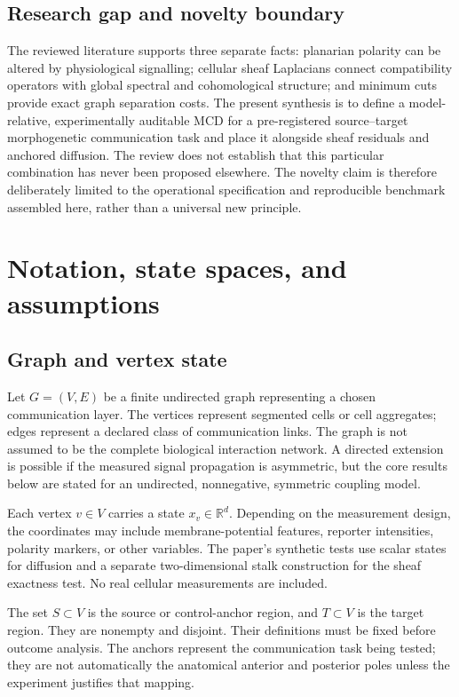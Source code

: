 \documentclass[12pt,a4paper]{article}
\newcommand{\R}{\mathbb{R}}
\begin{document}
\subsection{Research gap and novelty boundary}
The reviewed literature supports three separate facts: planarian polarity can be altered by physiological signalling; cellular sheaf Laplacians connect compatibility operators with global spectral and cohomological structure; and minimum cuts provide exact graph separation costs. The present synthesis is to define a model-relative, experimentally auditable MCD for a pre-registered source--target morphogenetic communication task and place it alongside sheaf residuals and anchored diffusion. The review does not establish that this particular combination has never been proposed elsewhere. The novelty claim is therefore deliberately limited to the operational specification and reproducible benchmark assembled here, rather than a universal new principle.

\section{Notation, state spaces, and assumptions}
\subsection{Graph and vertex state}
Let \(G=(V,E)\) be a finite undirected graph representing a chosen communication layer. The vertices represent segmented cells or cell aggregates; edges represent a declared class of communication links. The graph is not assumed to be the complete biological interaction network. A directed extension is possible if the measured signal propagation is asymmetric, but the core results below are stated for an undirected, nonnegative, symmetric coupling model.

Each vertex \(v\in V\) carries a state \(x_v\in\R^d\). Depending on the measurement design, the coordinates may include membrane-potential features, reporter intensities, polarity markers, or other variables. The paper's synthetic tests use scalar states for diffusion and a separate two-dimensional stalk construction for the sheaf exactness test. No real cellular measurements are included.

The set \(S\subset V\) is the source or control-anchor region, and \(T\subset V\) is the target region. They are nonempty and disjoint. Their definitions must be fixed before outcome analysis. The anchors represent the communication task being tested; they are not automatically the anatomical anterior and posterior poles unless the experiment justifies that mapping.
\end{document}
